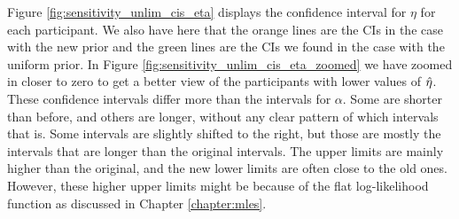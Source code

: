 Figure \ref{fig:sensitivity_unlim_cis_eta} displays the confidence interval for $\eta$ for each participant. We also have here that the orange lines are the CIs in the case with the new prior and the green lines are the CIs we found in the case with the uniform prior. In Figure \ref{fig:sensitivity_unlim_cis_eta_zoomed} we have zoomed in closer to zero to get a better view of the participants with lower values of $\hat{\eta}$. These confidence intervals differ more than the intervals for $\alpha$. 
Some are shorter than before, and others are longer, without any clear pattern of which intervals that is. Some intervals are slightly shifted to the right, but those are mostly the intervals that are longer than the original intervals. The upper limits are mainly higher than the original, and the new lower limits are often close to the old ones. 
However, these higher upper limits might be because of the flat log-likelihood function as discussed in Chapter \ref{chapter:mles}.
